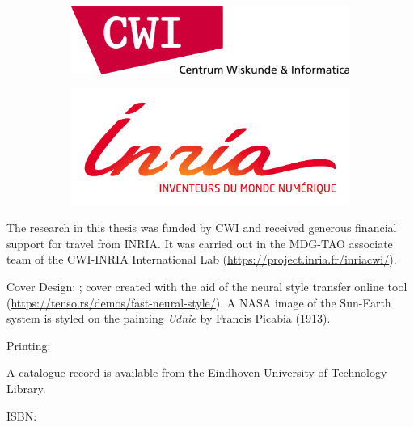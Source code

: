
\begin{figure}
    \centering
    \begin{subfigure}[b]{0.6\textwidth}
      \centering
      \includegraphics[width=\textwidth]{figures/cwi-logo}
    \end{subfigure}
    \hfill
    \begin{subfigure}[b]{0.6\textwidth}
      \centering
      \includegraphics[width=\textwidth]{figures/inria-logo}
    \end{subfigure}
\end{figure}

\vspace{\fill}

{\noindent
The research in this thesis was funded by CWI and received generous financial support for travel 
from INRIA. It was carried out in the MDG-TAO associate team of the CWI-INRIA International Lab 
(\url{https://project.inria.fr/inriacwi/}).
}

\vspace{\fill}

{
\noindent
Cover Design: \coverdesign; cover created with the aid of the neural style 
transfer online tool (\url{https://tenso.rs/demos/fast-neural-style/}). A NASA 
image of the Sun-Earth system is styled on the painting \textit{Udnie} 
by Francis Picabia (1913).  

\vspace{\baselineskip}

\noindent
Printing: \printingcompany

\vspace{\baselineskip}

\noindent
A catalogue record is available from the Eindhoven University of Technology Library. 

\vspace{\baselineskip}

\noindent
ISBN: \isbncode
}

